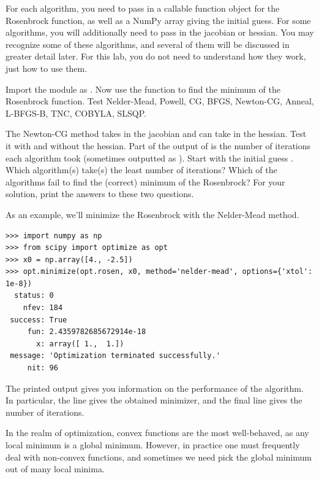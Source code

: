 For each algorithm, you need to pass in a callable function object for the Rosenbrock function, as well as a NumPy array giving the initial guess.
For some algorithms, you will additionally need to pass in the jacobian or hessian.
You may recognize some of these algorithms, and several of them will be discussed in greater detail later. For this lab, you do not need to understand how they work, just
how to use them.

\begin{problem}
Import the  module as . Now use the  function to find the minimum of the Rosenbrock function.
Test Nelder-Mead, Powell, CG, BFGS, Newton-CG, Anneal, L-BFGS-B, TNC, COBYLA, SLSQP.

The Newton-CG method takes in the jacobian and can take in the hessian. Test it with and without the hessian.
Part of the output of  is the number of iterations each algorithm took (sometimes outputted as ).
Start with the initial guess .
Which algorithm(s) take(s) the least number of iterations?
Which of the algorithms fail to find the (correct) minimum of the Rosenbrock?
For your solution, print the answers to these two questions.

As an example, we'll minimize the Rosenbrock with the Nelder-Mead method.
\begin{lstlisting}
>>> import numpy as np
>>> from scipy import optimize as opt
>>> x0 = np.array([4., -2.5])
>>> opt.minimize(opt.rosen, x0, method='nelder-mead', options={'xtol': 1e-8})
  status: 0
    nfev: 184
 success: True
     fun: 2.4359782685672914e-18
       x: array([ 1.,  1.])
 message: 'Optimization terminated successfully.'
     nit: 96
\end{lstlisting}
The printed output gives you information on the performance of the algorithm. In particular, the line  gives the obtained minimizer, and the final
line  gives the number of iterations.
\end{problem}

In the realm of optimization, convex functions are the most well-behaved, as any local minimum is a global minimum.
However, in practice one must frequently deal with non-convex functions, and sometimes we need pick the global minimum out of many local minima.

